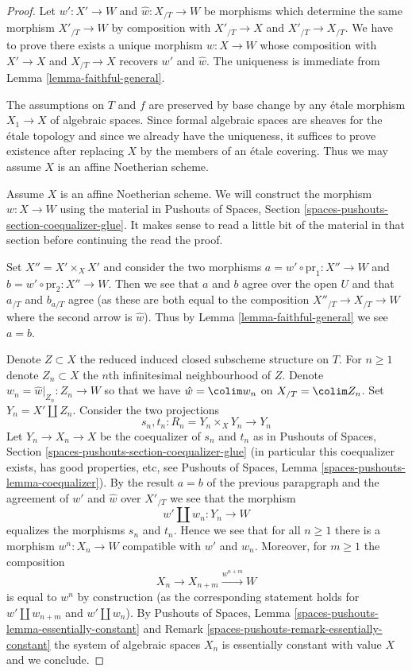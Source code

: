 \begin{proof}
Let $w' : X' \to W$ and $\hat w : X_{/T} \to W$ be morphisms
which determine the same morphism $X'_{/T} \to W$ by composition
with $X'_{/T} \to X$ and $X'_{/T} \to X_{/T}$. We have to prove
there exists a unique morphism $w : X \to W$ whose composition
with $X' \to X$ and $X_{/T} \to X$ recovers $w'$ and $\hat w$.
The uniqueness is immediate from Lemma \ref{lemma-faithful-general}.

\medskip\noindent
The assumptions on $T$ and $f$ are preserved by base change
by any \'etale morphism $X_1 \to X$ of algebraic spaces.
Since formal algebraic spaces are sheaves for the
\'etale topology and since we already have the uniqueness,
it suffices to prove existence after replacing $X$ by
the members of an \'etale covering. Thus we may assume $X$ is
an affine Noetherian scheme.

\medskip\noindent
Assume $X$ is an affine Noetherian scheme. We will construct
the morphism $w : X \to W$ using the material in
Pushouts of Spaces, Section \ref{spaces-pushouts-section-coequalizer-glue}.
It makes sense to read a little bit of the material
in that section before continuing the read the proof.

\medskip\noindent
Set $X'' = X' \times_X X'$ and consider the two morphisms
$a = w' \circ \text{pr}_1 : X'' \to W$ and 
$b = w' \circ \text{pr}_2 : X'' \to W$.
Then we see that $a$ and $b$ agree over the open $U$
and that $a_{/T}$ and $b_{a/T}$ agree (as these are
both equal to the composition $X''_{/T} \to X_{/T} \to W$
where the second arrow is $\hat w$).
Thus by Lemma \ref{lemma-faithful-general}
we see $a = b$.

\medskip\noindent
Denote $Z \subset X$ the reduced induced closed subscheme structure
on $T$. For $n \geq 1$ denote $Z_n \subset X$ the $n$th infinitesimal
neighbourhood of $Z$. Denote $w_n = \hat w|_{Z_n} : Z_n \to W$
so that we have $\hat w = \colim w_n$ on $X_{/T} = \colim Z_n$.
Set $Y_n = X' \amalg Z_n$. Consider the two projections
$$
s_n, t_n : R_n = Y_n \times_X Y_n \longrightarrow Y_n
$$
Let $Y_n \to X_n \to X$ be the coequalizer of $s_n$ and $t_n$ as in
Pushouts of Spaces, Section \ref{spaces-pushouts-section-coequalizer-glue}
(in particular this coequalizer exists, has good properties, etc, see
Pushouts of Spaces, Lemma \ref{spaces-pushouts-lemma-coequalizer}).
By the result $a = b$ of the previous parapgraph and the agreement
of $w'$ and $\hat w$ over $X'_{/T}$ we see that the morphism
$$
w' \amalg w_n : Y_n \longrightarrow W
$$
equalizes the morphisms $s_n$ and $t_n$. Hence we see that for all $n \geq 1$
there is a morphism $w^n : X_n \to W$ compatible with $w'$ and $w_n$.
Moreover, for $m \geq 1$ the composition
$$
X_n \to X_{n + m} \xrightarrow{w^{n + m}} W
$$
is equal to $w^n$ by construction (as the corresponding statement holds
for $w' \amalg w_{n + m}$ and $w' \amalg w_n$). By
Pushouts of Spaces, Lemma
\ref{spaces-pushouts-lemma-essentially-constant} and
Remark \ref{spaces-pushouts-remark-essentially-constant}
the system of algebraic spaces $X_n$ is essentially constant
with value $X$ and we conclude.
\end{proof}
